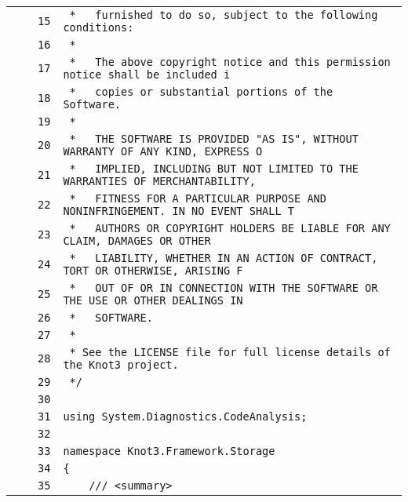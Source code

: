 \documentclass[a4paper,10pt]{article}
\begin{document}
\begin{longtable}[l]{lrrl}
\cellcolor{gray} &  & \verb~15~ & \verb~ *   furnished to do so, subject to the following conditions:~\\
\cellcolor{gray} &  & \verb~16~ & \verb~ *~\\
\cellcolor{gray} &  & \verb~17~ & \verb~ *   The above copyright notice and this permission notice shall be included i~\\
\cellcolor{gray} &  & \verb~18~ & \verb~ *   copies or substantial portions of the Software.~\\
\cellcolor{gray} &  & \verb~19~ & \verb~ *~\\
\cellcolor{gray} &  & \verb~20~ & \verb~ *   THE SOFTWARE IS PROVIDED "AS IS", WITHOUT WARRANTY OF ANY KIND, EXPRESS O~\\
\cellcolor{gray} &  & \verb~21~ & \verb~ *   IMPLIED, INCLUDING BUT NOT LIMITED TO THE WARRANTIES OF MERCHANTABILITY,~\\
\cellcolor{gray} &  & \verb~22~ & \verb~ *   FITNESS FOR A PARTICULAR PURPOSE AND NONINFRINGEMENT. IN NO EVENT SHALL T~\\
\cellcolor{gray} &  & \verb~23~ & \verb~ *   AUTHORS OR COPYRIGHT HOLDERS BE LIABLE FOR ANY CLAIM, DAMAGES OR OTHER~\\
\cellcolor{gray} &  & \verb~24~ & \verb~ *   LIABILITY, WHETHER IN AN ACTION OF CONTRACT, TORT OR OTHERWISE, ARISING F~\\
\cellcolor{gray} &  & \verb~25~ & \verb~ *   OUT OF OR IN CONNECTION WITH THE SOFTWARE OR THE USE OR OTHER DEALINGS IN~\\
\cellcolor{gray} &  & \verb~26~ & \verb~ *   SOFTWARE.~\\
\cellcolor{gray} &  & \verb~27~ & \verb~ *~\\
\cellcolor{gray} &  & \verb~28~ & \verb~ * See the LICENSE file for full license details of the Knot3 project.~\\
\cellcolor{gray} &  & \verb~29~ & \verb~ */~\\
\cellcolor{gray} &  & \verb~30~ & \verb~~\\
\cellcolor{gray} &  & \verb~31~ & \verb~using System.Diagnostics.CodeAnalysis;~\\
\cellcolor{gray} &  & \verb~32~ & \verb~~\\
\cellcolor{gray} &  & \verb~33~ & \verb~namespace Knot3.Framework.Storage~\\
\cellcolor{gray} &  & \verb~34~ & \verb~{~\\
\cellcolor{gray} &  & \verb~35~ & \verb~    /// <summary>~\\

\end{longtable}
\end{document}
